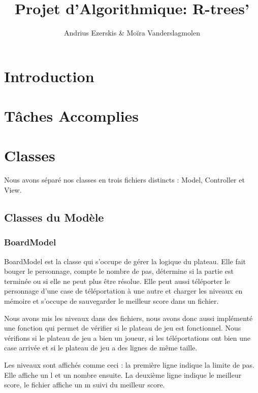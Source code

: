 \documentclass[utf8]{article}
\begin{document}
\begin{titlepage}


\author{Andrius Ezerskis \& Moïra Vanderslagmolen}
\title{Projet d'Algorithmique: R-trees'}

\maketitle
\end{titlepage}
\tableofcontents
\newpage
\begin{large}



\section{Introduction}
\indent
\par


\par

\section{Tâches Accomplies}

\par
\indent


\par


\section{Classes}
\indent
\par
Nous avons séparé nos classes en trois fichiers distincts : Model, Controller et View.
\par
\subsection{Classes du Modèle}

\subsubsection{BoardModel}
\indent
\par
BoardModel est la classe qui s'occupe de gérer la logique du plateau. Elle fait
bouger le personnage, compte le nombre de pas, détermine si la partie est
terminée ou si elle ne peut plus être résolue. Elle peut aussi téléporter le
personnage d'une case de téléportation à une autre et charger les niveaux en
mémoire et s'occupe de sauvegarder le meilleur score dans un fichier.
\par
\indent
\par
Nous avons mis les niveaux dans des fichiers, nous avons donc aussi implémenté
une fonction qui permet de vérifier si le plateau de jeu est fonctionnel. Nous
vérifions si le plateau de jeu a bien un joueur, si les téléportations ont bien une
case arrivée et si le plateau de jeu a des lignes de même taille.
\par
Les niveaux sont affichés comme ceci : la première ligne indique la limite de
pas. Elle affiche un l et un nombre ensuite. La deuxième ligne indique le
meilleur score, le fichier affiche un m suivi du meilleur score.
\par


\end{large}
\end{document}
